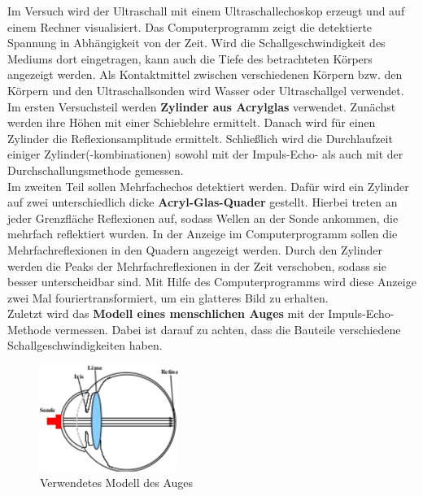 Im Versuch wird der Ultraschall mit einem Ultraschallechoskop erzeugt und auf einem Rechner visualisiert. Das Computerprogramm zeigt die detektierte Spannung in Abhängigkeit von der Zeit. Wird die Schallgeschwindigkeit des Mediums dort eingetragen, kann auch die Tiefe des betrachteten Körpers angezeigt werden. Als Kontaktmittel zwischen verschiedenen Körpern bzw. den Körpern und den Ultraschallsonden wird Wasser oder Ultraschallgel verwendet. \\
Im ersten Versuchsteil werden \textbf{Zylinder aus Acrylglas} verwendet. Zunächst werden ihre Höhen mit einer Schieblehre ermittelt. Danach wird für einen Zylinder die Reflexionsamplitude ermittelt. Schließlich wird die Durchlaufzeit einiger Zylinder(-kombinationen) sowohl mit der Impuls-Echo- als auch mit der Durchschallungsmethode gemessen. \\
Im zweiten Teil sollen Mehrfachechos detektiert werden. Dafür wird ein Zylinder auf zwei unterschiedlich dicke \textbf{Acryl-Glas-Quader} gestellt. Hierbei treten an jeder Grenzfläche Reflexionen auf, sodass Wellen an der Sonde ankommen, die mehrfach reflektiert wurden. In der Anzeige im Computerprogramm sollen die Mehrfachreflexionen in den Quadern angezeigt werden. Durch den Zylinder werden die Peaks der Mehrfachreflexionen in der Zeit verschoben, sodass sie besser unterscheidbar sind. Mit Hilfe des Computerprogramms wird diese Anzeige zwei Mal fouriertransformiert, um ein glatteres Bild zu erhalten. \\
Zuletzt wird das \textbf{Modell eines menschlichen Auges} mit der Impuls-Echo-Methode vermessen. Dabei ist darauf zu achten, dass die Bauteile verschiedene Schallgeschwindigkeiten haben.
\begin{figure}[h!]
	\centering
	\includegraphics[width=0.4\textwidth]{Auge.pdf}
	\caption{Verwendetes Modell des Auges}
	\label{fig:Auge}
\end{figure}